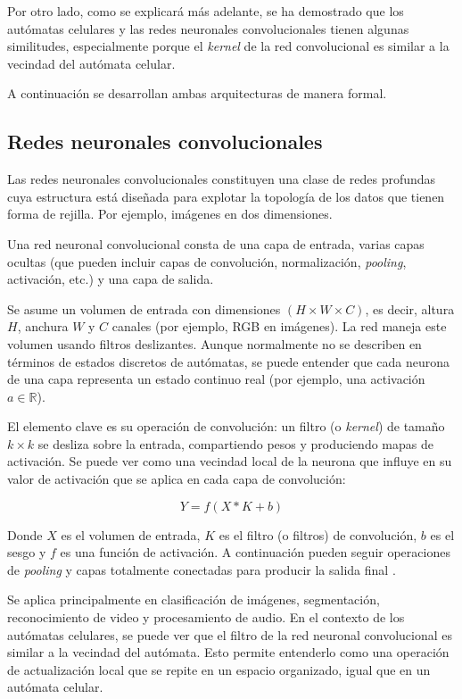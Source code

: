 Por otro lado, como se explicará más adelante, se ha demostrado que los autómatas celulares y las redes neuronales convolucionales tienen algunas similitudes, especialmente porque el \textit{kernel} de la red convolucional es similar a la vecindad del autómata celular.

A continuación se desarrollan ambas arquitecturas de manera formal.

\subsection{Redes neuronales convolucionales}

Las redes neuronales convolucionales constituyen una clase de redes profundas cuya estructura está diseñada para explotar la topología de los datos que tienen forma de rejilla. Por ejemplo, imágenes en dos dimensiones.

Una red neuronal convolucional consta de una capa de entrada, varias capas ocultas (que pueden incluir capas de convolución, normalización, \textit{pooling}, activación, etc.) y una capa de salida.

Se asume un volumen de entrada con dimensiones $(H \times W \times C)$, es decir, altura $H$, anchura $W$ y $C$ canales (por ejemplo, RGB en imágenes). La red maneja este volumen usando filtros deslizantes. Aunque normalmente no se describen en términos de estados discretos de autómatas, se puede entender que cada neurona de una capa representa un estado continuo real (por ejemplo, una activación $a \in \mathbb{R}$).

El elemento clave es su operación de convolución: un filtro (o \textit{kernel}) de tamaño $k \times k$ se desliza sobre la entrada, compartiendo pesos y produciendo mapas de activación. Se puede ver como una vecindad local de la neurona que influye en su valor de activación que se aplica en cada capa de convolución:

\[
Y = f(X * K + b)
\]

Donde $X$ es el volumen de entrada, $K$ es el filtro (o filtros) de convolución, $b$ es el sesgo y $f$ es una función de activación. A continuación pueden seguir operaciones de \textit{pooling} y capas totalmente conectadas para producir la salida final \cite{cnn}.

Se aplica principalmente en clasificación de imágenes, segmentación, reconocimiento de video y procesamiento de audio. En el contexto de los autómatas celulares, se puede ver que el filtro de la red neuronal convolucional es similar a la vecindad del autómata. Esto permite entenderlo como una operación de actualización local que se repite en un espacio organizado, igual que en un autómata celular.

